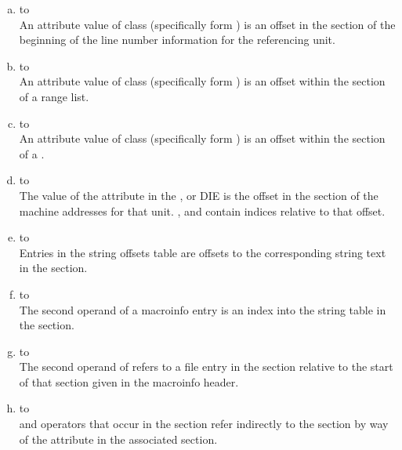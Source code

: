 \begin{enumerate}[(a)]
\item \dotdebuginfo{} to \dotdebugline \\
An attribute value of class 
 (specifically form
\DWFORMsecoffset) 
is an offset in the 
\dotdebugline{} section of the
beginning of the line number information for the referencing unit.

\item \dotdebuginfo{} to \dotdebugranges \\
An attribute value of class  
(specifically form
\DWFORMsecoffset) 
is an offset within the \dotdebugranges{} section of
a range list.

\item \dotdebuginfo{} to \dotdebugloc \\
An attribute value of class  
(specifically form
\DWFORMsecoffset) 
is an offset within the \dotdebugloc{} 
section of a
.

\item \dotdebuginfo{} to \dotdebugaddr \\
The value of the \DWATaddrbase{} attribute in the
\DWTAGcompileunit{}, \DWTAGtypeunit{} or \DWTAGpartialunit{} DIE is the
offset in the \dotdebugaddr{} section of the machine
addresses for that unit.
\DWFORMaddrx, \DWOPaddrx{} and \DWOPconstx{} contain
indices relative to that offset.

\item \dotdebugstroffsets{} to \dotdebugstr \\
Entries in the string offsets table
are offsets to the corresponding string text in the 
\dotdebugstr{} section.

\item \dotdebugmacro{} to \dotdebugstroffsets \\
The second operand of a 
\DWMACROdefineindirect{} macroinfo
entry is an index into the string table in the 
\dotdebugstr{} section.


\item \dotdebugmacro{} to \dotdebugline \\
The second operand of 
\DWMACROstartfile{} refers to a file entry in the 
\dotdebugline{} section relative to the start 
of that section given in the macroinfo header.

\item \dotdebugloc{} to \dotdebugaddr \\
\DWOPaddrx{} and \DWOPconstx{} operators that occur in the 
\dotdebugloc{} section refer indirectly to the 
\dotdebugaddr{} section by way of the 
\DWATaddrbase{} attribute in the associated \dotdebuginfo{} 
section. 


\end{enumerate}
